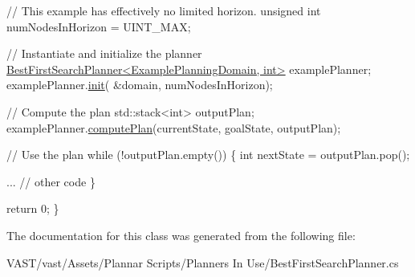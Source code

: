 \begin{DoxyCode}
               \textcolor{comment}{// This example has effectively no limited horizon.}
               \textcolor{keywordtype}{unsigned} \textcolor{keywordtype}{int} numNodesInHorizon = UINT\_MAX;
          
               \textcolor{comment}{// Instantiate and initialize the planner}
               \hyperlink{class_best_first_search_planner}{BestFirstSearchPlanner<ExamplePlanningDomain, int>}
       examplePlanner;
               examplePlanner.\hyperlink{class_best_first_search_planner_a00c06f79faf00907ec4906086c37776f}{init}( &domain, numNodesInHorizon);
          
               \textcolor{comment}{// Compute the plan}
               std::stack<int> outputPlan;
               examplePlanner.\hyperlink{class_best_first_search_planner_a777fb06939a33b3f3effb24b0dbda076}{computePlan}(currentState, goalState, 
      outputPlan);
          
               \textcolor{comment}{// Use the plan}
               \textcolor{keywordflow}{while} (!outputPlan.empty()) \{
                   \textcolor{keywordtype}{int} nextState = outputPlan.pop();
          
                   ... \textcolor{comment}{// other code}
               \}
          
               \textcolor{keywordflow}{return} 0;
           \}
\end{DoxyCode}
 

The documentation for this class was generated from the following file\-:\begin{DoxyCompactItemize}
\item 
V\-A\-S\-T/vast/\-Assets/\-Plannar Scripts/\-Planners In Use/Best\-First\-Search\-Planner.\-cs\end{DoxyCompactItemize}
